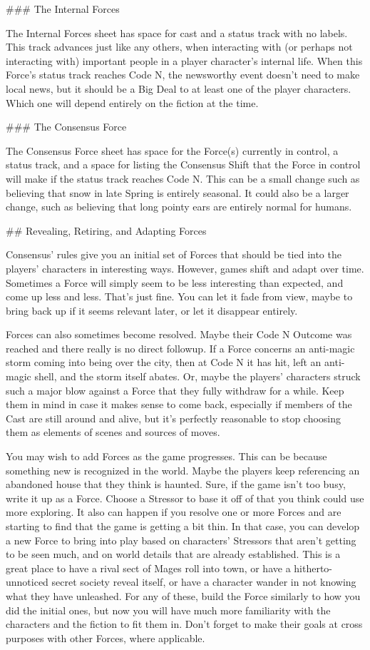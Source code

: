 \documentclass[
  oneside,
  statementpaper,
  9pt]{memoir}
\begin{document}
\begin{MC}
### The Internal Forces

The Internal Forces sheet has space for cast and a status track with no labels. This track advances just like any others, when interacting with (or perhaps not interacting with) important people in a player character’s internal life. When this Force’s status track reaches Code N, the newsworthy event doesn’t need to make local news, but it should be a Big Deal to at least one of the player characters. Which one will depend entirely on the fiction at the time.

### The Consensus Force

The Consensus Force sheet has space for the Force(s) currently in control, a status track, and a space for listing the Consensus Shift that the Force in control will make if the status track reaches Code N. This can be a small change such as believing that snow in late Spring is entirely seasonal. It could also be a larger change, such as believing that long pointy ears are entirely normal for humans.

## Revealing, Retiring, and Adapting Forces

Consensus’ rules give you an initial set of Forces that should be tied into the players’ characters in interesting ways. However, games shift and adapt over time. Sometimes a Force will simply seem to be less interesting than expected, and come up less and less. That’s just fine. You can let it fade from view, maybe to bring back up if it seems relevant later, or let it disappear entirely.

Forces can also sometimes become resolved. Maybe their Code N Outcome was reached and there really is no direct followup. If a Force concerns an anti-magic storm coming into being over the city, then at Code N it has hit, left an anti-magic shell, and the storm itself abates. Or, maybe the players’ characters struck such a major blow against a Force that they fully withdraw for a while. Keep them in mind in case it makes sense to come back, especially if members of the Cast are still around and alive, but it’s perfectly reasonable to stop choosing them as elements of scenes and sources of moves.

You may wish to add Forces as the game progresses. This can be because something new is recognized in the world. Maybe the players keep referencing an abandoned house that they think is haunted. Sure, if the game isn’t too busy, write it up as a Force. Choose a Stressor to base it off of that you think could use more exploring. It also can happen if you resolve one or more Forces and are starting to find that the game is getting a bit thin. In that case, you can develop a new Force to bring into play based on characters’ Stressors that aren’t getting to be seen much, and on world details that are already established. This is a great place to have a rival sect of Mages roll into town, or have a hitherto-unnoticed secret society reveal itself, or have a character wander in not knowing what they have unleashed. For any of these, build the Force similarly to how you did the initial ones, but now you will have much more familiarity with the characters and the fiction to fit them in. Don’t forget to make their goals at cross purposes with other Forces, where applicable.


\end{MC}
\end{document}
